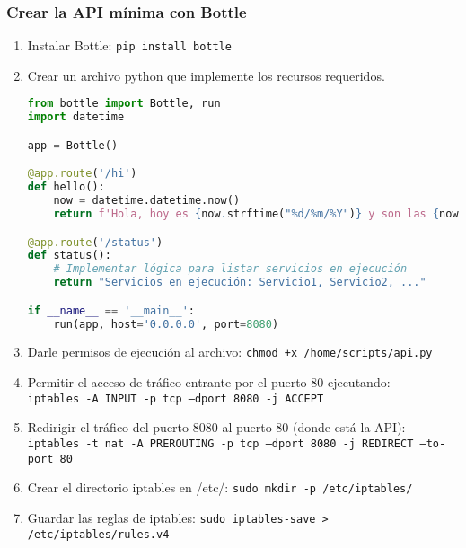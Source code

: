 \documentclass{article}
\begin{document}
\subsubsection{Crear la API mínima con Bottle}
\begin{enumerate}
  \item Instalar Bottle: \texttt{pip install bottle}
  \item Crear un archivo python que implemente los recursos requeridos.


\begin{lstlisting}[language=Python, caption=API básica con Bottle]
from bottle import Bottle, run
import datetime

app = Bottle()

@app.route('/hi')
def hello():
    now = datetime.datetime.now()
    return f'Hola, hoy es {now.strftime("%d/%m/%Y")} y son las {now.strftime("%H:%M:%S")}'

@app.route('/status')
def status():
    # Implementar lógica para listar servicios en ejecución
    return "Servicios en ejecución: Servicio1, Servicio2, ..."

if __name__ == '__main__':
    run(app, host='0.0.0.0', port=8080)
\end{lstlisting}

    \item Darle permisos de ejecución al archivo: \texttt{chmod +x /home/scripts/api.py}
    \item Permitir el acceso de tráfico entrante por el puerto 80 ejecutando:\\ \texttt{iptables -A INPUT -p tcp --dport 8080 -j ACCEPT}
    \item Redirigir el tráfico del puerto 8080 al puerto 80 (donde está la API):\\ \texttt{iptables -t nat -A PREROUTING -p tcp --dport 8080 -j REDIRECT --to-port 80}
    \item Crear el directorio iptables en /etc/: \texttt{sudo mkdir -p /etc/iptables/}
    \item Guardar las reglas de iptables: \texttt{sudo iptables-save > /etc/iptables/rules.v4}
\end{enumerate}


\newpage


\end{document}

